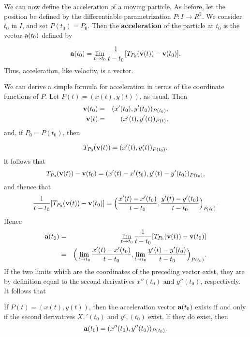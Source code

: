 

We can now define the acceleration of a moving particle. As before, let the position be defined by the differentiable parametrization $P: I \rightarrow R^2$. We consider $t_0$ in $I$, and set $P(t_0) = P_0$. Then the \textbf{acceleration} of the particle at $t_0$ is the vector $\mbox{\bf{a}}(t_0)$ defined by


\begin{equation}
\mbox{\bf{a}}(t_0) = \lim_{t \rightarrow t_0} \frac{1}{t - t_0} [T_{P_0}(\mbox{\bf{v}}(t) ) - \mbox{\bf{v}}(t_0)] .
\label{eq10.5.7}
\end{equation}
Thus, acceleration, like velocity, is a vector.
\medskip

We can derive a simple formula for acceleration in terms of the coordinate functions of $P$. Let $P(t) = (x(t), y(t))$, as usual. Then 
\begin{eqnarray*}
\mbox{\bf{v}}(t_0) &=& (x'(t_0), y'(t_0))_{P(t_0)}, \\
    \mbox{\bf{v}}(t) &=& (x'(t), y'(t))_{P(t)}, 
\end{eqnarray*}
and, if $P_0 = P(t_0)$, then

$$
T_{P_0} (\mbox{\bf{v}}(t)) = (x'(t), y (t))_{P(t_0)} .
$$
lt follows that
$$
T_{P_0} (\mbox{\bf{v}}(t)) - \mbox{\bf{v}}(t_0) = (x'(t) - x'(t_0), y'(t) - y'(t_0))_{P(t_0)},
$$
and thence that
$$
\frac{1}{t - t_0} [T_{P_0} (\mbox{\bf{v}}(t)) - \mbox{\bf{v}}(t_0)] = \Big( \frac{x'(t) - x'(t_0)}{t - t_0}, \frac{y'(t) - y'(t_0)}{t - t_0} \Big)_{P_(t_0)}.
$$
Hence
\begin{eqnarray*}
\mbox{\bf{a}}(t_0) &=& \lim_{t \rightarrow t_0} \frac{1}{t - t_0} [T_{P_0}(\mbox{\bf{v}}(t)) - \mbox{\bf{v}}(t_0)]  \\
          &=& \Big( \lim_{t \rightarrow t_0} \frac{x'(t) - x'(t_0)}{t - t_0}, 
                   \lim_{t \rightarrow t_0} \frac{y'(t) - y'(t_0)}{t - t_0} \Big)_{P(t_0)}.
\end{eqnarray*}
If the two limits which are the coordinates of the preceding vector exist, they are by definition equal to the second derivatives $x''(t_0)$ and $y''(t_0)$, respectively. It follows that

\begin{theorem} 
If $P(t) = (x(t), y(t))$, then the acceleration vector $\mbox{\bf{a}}(t_0)$ exists if and only if the second derivatives $X,'(t_0)$ and $y',(t_0)$ exist. lf they do exist, then
$$
\mbox{\bf{a}}(t_0) = (x''(t_0), y''(t_0))_{P(t_0)}. 
$$
\end{theorem}

